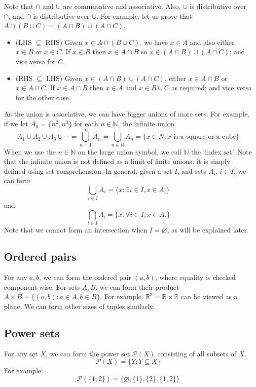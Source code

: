 Note that \(\cap\) and \(\cup\) are commutative and associative.
Also, \(\cup\) is distributive over \(\cap\), and \(\cap\) is distributive over \(\cup\).
For example, let us prove that \(A \cap (B \cup C) = (A \cap B) \cup (A \cap C)\).
\begin{itemize}
	\item (LHS \(\subseteq\) RHS) Given \(x \in A \cap (B \cup C)\), we have \(x \in A\) and also either \(x \in B\) or \(x \in C\).
	      If \(x \in B\) then \(x \in A \cap B\) so \(x \in (A \cap B) \cup (A \cap C)\); and vice versa for \(C\).
	\item (RHS \(\subseteq\) LHS) Given \(x \in (A \cap B) \cup (A \cap C)\), either \(x \in A \cap B\) or \(x \in A \cap C\).
	      If \(x \in A \cap B\) then \(x \in A\) and \(x \in B \cup C\) as required; and vice versa for the other case.
\end{itemize}
As the union is associative, we can have bigger unions of more sets.
For example, if we let \(A_n = \{ n^2, n^3 \}\) for each \(n \in \mathbb N\), the infinite union
\[
	A_1 \cup A_2 \cup A_3 \cup \cdots = \bigcup_{n=1}^\infty A_n = \bigcup_{n \in \mathbb N} A_n = \{ x \in N: x \text{ is a square or a cube} \}
\]
When we use the \(n \in \mathbb N\) on the large union symbol, we call \(\mathbb N\) the `index set'.
Note that the infinite union is not defined as a limit of finite unions; it is simply defined using set comprehension.
In general, given a set \(I\), and sets \(A_i\), \(i \in I\), we can form
\[
	\bigcup_{i \in I}A_i = \{ x: \exists i \in I, x \in A_i \}
\]
and
\[
	\bigcap_{i \in I}A_i = \{ x: \forall i \in I, x \in A_i \}
\]
Note that we cannot form an intersection when \(I = \varnothing\), as will be explained later.

\subsection{Ordered pairs}
For any \(a, b\), we can form the ordered pair \((a, b)\), where equality is checked component-wise.
For sets \(A, B\), we can form their product \(A \times B = \{ (a, b) : a \in A, b \in B \}\).
For example, \(\mathbb R^2 = \mathbb R \times \mathbb R\) can be viewed as a plane.
We can form other sizes of tuples similarly.

\subsection{Power sets}
For any set \(X\), we can form the power set \(\mathcal P(X)\) consisting of all subsets of \(X\).
\[
	\mathcal P(X) = \{ Y: Y \subseteq X \}
\]
For example:
\[
	\mathcal P(\{ 1, 2 \}) = \{ \varnothing, \{ 1 \}, \{ 2 \}, \{ 1, 2\} \}
\]

